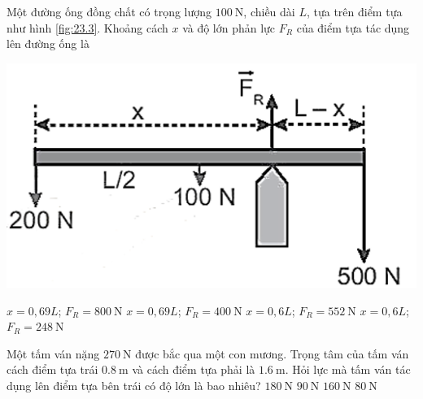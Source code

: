 \begin{ex}
	Một đường ống đồng chất có trọng lượng $\SI{100}{\newton}$, chiều dài $L$, tựa trên điểm tựa như hình \ref{fig:23.3}. Khoảng cách $x$ và độ lớn phản lực $F_R$ của điểm tựa tác dụng lên đường ống là
	\begin{center}
		\includegraphics[width=0.4\linewidth]{../figs/VN10-2022-PH-TP023-P-3}
		\label{fig:23.3}
	\end{center}	
	\choice
	{\True $x=0,69L$; $F_R=\SI{800}{\newton}$}
	{$x=0,69L$; $F_R=\SI{400}{\newton}$}
	{$x=0,6L$; $F_R=\SI{552}{\newton}$}
	{$x=0,6L$; $F_R=\SI{248}{\newton}$}
\end{ex}
\begin{ex}
	Một tấm ván nặng $\SI{270}{\newton}$ được bắc qua một con mương. Trọng tâm của tấm ván cách điểm tựa trái $\SI{0.8}{\meter}$ và cách điểm tựa phải là $\SI{1.6}{\meter}$. Hỏi lực mà tấm ván tác dụng lên điểm tựa bên trái có độ lớn là bao nhiêu?	
	\choice
	{\True $\SI{180}{\newton}$}
	{$\SI{90}{\newton}$}
	{$\SI{160}{\newton}$}
	{$\SI{80}{\newton}$}
\end{ex}
